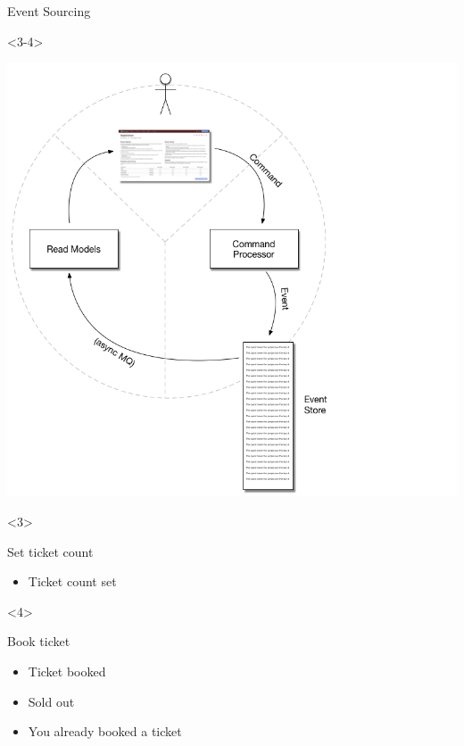\begin{frame}[fragile]{Event Sourcing}
\begin{onlyenv}<3-4>
\begin{minipage}{.7\textwidth}
\includegraphics[width=\textwidth]{../EventSourcing3.png}
\end{minipage} \hfill
\end{onlyenv}
\begin{onlyenv}<3>
\begin{minipage}{0.25\textwidth}
\small
Set ticket count
\begin{itemize}
\item Ticket count set
\end{itemize}
\end{minipage}
\end{onlyenv}
\begin{onlyenv}<4>
\begin{minipage}{0.25\textwidth}
\small
Book ticket
\begin{itemize}
\item Ticket booked
\item Sold out
\item You already booked a ticket
\end{itemize}
\end{minipage}
\end{onlyenv}


\end{frame}
